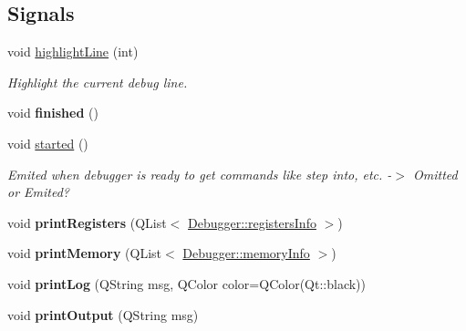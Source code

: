 \subsection*{Signals}
\begin{DoxyCompactItemize}
\item 
\hypertarget{class_debugger_adbe43a9b006c1ff0df00f959022a180c}{}void \hyperlink{class_debugger_adbe43a9b006c1ff0df00f959022a180c}{highlight\+Line} (int)\label{class_debugger_adbe43a9b006c1ff0df00f959022a180c}

\begin{DoxyCompactList}\small\item\em Highlight the current debug line. \end{DoxyCompactList}\item 
\hypertarget{class_debugger_acf0d732e2bd6411e03c3e3f7ab072db4}{}void {\bfseries finished} ()\label{class_debugger_acf0d732e2bd6411e03c3e3f7ab072db4}

\item 
\hypertarget{class_debugger_ae3c0d16ffb07fca28532471dac4a3d04}{}void \hyperlink{class_debugger_ae3c0d16ffb07fca28532471dac4a3d04}{started} ()\label{class_debugger_ae3c0d16ffb07fca28532471dac4a3d04}

\begin{DoxyCompactList}\small\item\em Emited when debugger is ready to get commands like step into, etc. -\/$>$ Omitted or Emited? \end{DoxyCompactList}\item 
\hypertarget{class_debugger_a97bb6cfc618c4f76d09c245def0cc6fe}{}void {\bfseries print\+Registers} (Q\+List$<$ \hyperlink{struct_debugger_1_1registers_info}{Debugger\+::registers\+Info} $>$)\label{class_debugger_a97bb6cfc618c4f76d09c245def0cc6fe}

\item 
\hypertarget{class_debugger_ac17eb18b4f55846b2ee26d20081165d6}{}void {\bfseries print\+Memory} (Q\+List$<$ \hyperlink{struct_debugger_1_1memory_info}{Debugger\+::memory\+Info} $>$)\label{class_debugger_ac17eb18b4f55846b2ee26d20081165d6}

\item 
\hypertarget{class_debugger_aaa170ace8d83be4d6d50eb77452b9970}{}void {\bfseries print\+Log} (Q\+String msg, Q\+Color color=Q\+Color(Qt\+::black))\label{class_debugger_aaa170ace8d83be4d6d50eb77452b9970}

\item 
\hypertarget{class_debugger_a33c5be2b419f3917f460eac35d5472b0}{}void {\bfseries print\+Output} (Q\+String msg)\label{class_debugger_a33c5be2b419f3917f460eac35d5472b0}


\end{DoxyCompactItemize}
